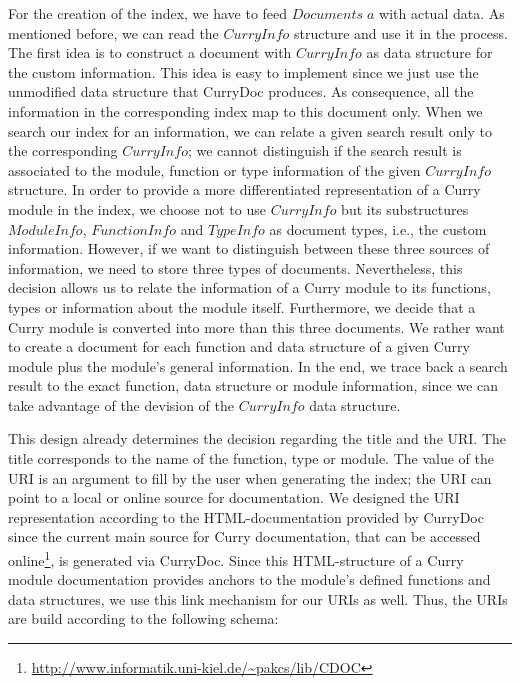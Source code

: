\documentclass[%
	latex,%
	a4paper,%
	oneside,%
	chapterprefix,%
	headsepline,%
	12pt%
]{scrbook}
\newcommand{\Conid}[1]{\mathit{#1}}
\newcommand{\Varid}[1]{\mathit{#1}}
\begin{document}
For the creation of the index, we have to feed \ensuremath{\Conid{Documents}\;\Varid{a}} with
actual data. %
As mentioned before, we can read the \ensuremath{\Conid{CurryInfo}} structure and use it
in the process. %
The first idea is to construct a document with \ensuremath{\Conid{CurryInfo}} as data
structure for the custom information. %
This idea is easy to implement since we just use the unmodified data
structure that CurryDoc produces. %
As consequence, all the information in the corresponding index map to
this document only. %
When we search our index for an information, we can relate a given
search result only to the corresponding \ensuremath{\Conid{CurryInfo}}; we cannot
distinguish if the search result is associated to the module, function
or type information of the given \ensuremath{\Conid{CurryInfo}} structure. %
In order to provide a more differentiated representation of a Curry
module in the index, we choose not to use \ensuremath{\Conid{CurryInfo}} but its
substructures \ensuremath{\Conid{ModuleInfo}}, \ensuremath{\Conid{FunctionInfo}} and \ensuremath{\Conid{TypeInfo}} as document
types, i.e., the custom information. %
However, if we want to distinguish between these three sources of
information, we need to store three types of documents. %
Nevertheless, this decision allows us to relate the information of a
Curry module to its functions, types or information about the module
itself. %
Furthermore, we decide that a Curry module is converted into more than
this three documents. %
We rather want to create a document for each function and data
structure of a given Curry module plus the module's general
information. %
In the end, we trace back a search result to the exact function, data
structure or module information, since we can take advantage of the
devision of the \ensuremath{\Conid{CurryInfo}} data structure. %

This design already determines the decision regarding the title and
the URI. %
The title corresponds to the name of the function, type or module. %
The value of the URI is an argument to fill by the user when
generating the index; the URI can point to a local or online source
for documentation. %
We designed the URI representation according to the HTML-documentation provided
by CurryDoc since the current main source for Curry documentation,
that can be accessed
online\footnote{\url{http://www.informatik.uni-kiel.de/~pakcs/lib/CDOC}},
is generated via CurryDoc. %
Since this HTML-structure of a Curry module documentation provides
anchors to the module's defined functions and data structures, we use
this link mechanism for our URIs as well. %
Thus, the URIs are build according to the following schema:
\end{document}
